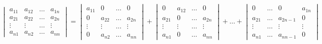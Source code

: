 \documentclass{book} %
\begin{document}
					\begin{thm}
						\begin{equation}
							\begin{vmatrix}
								a_{1 1} & a_{1 2} & \dots & a_{1 n} \\
								a_{2 1} & a_{2 2} & \dots & a_{2 n} \\
								\vdots & \vdots & \dots & \vdots \\
								a_{n 1} & a_{n 2} & \dots & a_{n n}
							\end{vmatrix}
							= \begin{vmatrix}
								a_{1 1} & 0 & \dots & 0 \\
								0 & a_{2 2} & \dots & a_{2 n} \\
								\vdots & \vdots & \dots & \vdots \\
								0 & a_{n 2} & \dots & a_{n n}
							\end{vmatrix}
							+ \begin{vmatrix}
								0 & a_{1 2} & \dots & 0 \\
								a_{2 1} & 0 & \dots & a_{2 n} \\
								\vdots & \vdots & \dots & \vdots \\
								a_{n 1} & 0 & \dots & a_{n n}
							\end{vmatrix}
							+ \dots + \begin{vmatrix}
								0 & \dots & 0 & a_{1 n} \\
								a_{2 1} & \dots & a_{2 n-1} & 0 \\
								\vdots & \dots & \vdots & \vdots \\
								a_{n 1} & \dots & a_{n n-1} & 0
							\end{vmatrix}
						\end{equation}
					\end{thm}
\end{document}

